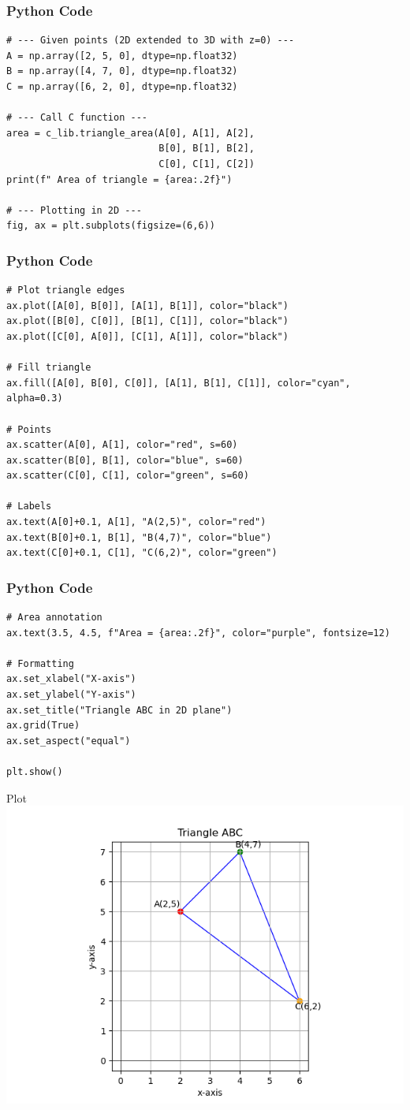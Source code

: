 \documentclass{beamer}
\begin{document}
\begin{frame}[fragile]
    \frametitle{Python Code}
    \begin{lstlisting}
# --- Given points (2D extended to 3D with z=0) ---
A = np.array([2, 5, 0], dtype=np.float32)
B = np.array([4, 7, 0], dtype=np.float32)
C = np.array([6, 2, 0], dtype=np.float32)

# --- Call C function ---
area = c_lib.triangle_area(A[0], A[1], A[2],
                           B[0], B[1], B[2],
                           C[0], C[1], C[2])
print(f" Area of triangle = {area:.2f}")

# --- Plotting in 2D ---
fig, ax = plt.subplots(figsize=(6,6))
    \end{lstlisting}
\end{frame}

\begin{frame}[fragile]
    \frametitle{Python Code}
    \begin{lstlisting}
# Plot triangle edges
ax.plot([A[0], B[0]], [A[1], B[1]], color="black")
ax.plot([B[0], C[0]], [B[1], C[1]], color="black")
ax.plot([C[0], A[0]], [C[1], A[1]], color="black")

# Fill triangle
ax.fill([A[0], B[0], C[0]], [A[1], B[1], C[1]], color="cyan", alpha=0.3)

# Points
ax.scatter(A[0], A[1], color="red", s=60)
ax.scatter(B[0], B[1], color="blue", s=60)
ax.scatter(C[0], C[1], color="green", s=60)

# Labels
ax.text(A[0]+0.1, A[1], "A(2,5)", color="red")
ax.text(B[0]+0.1, B[1], "B(4,7)", color="blue")
ax.text(C[0]+0.1, C[1], "C(6,2)", color="green")

    \end{lstlisting}
\end{frame}

\begin{frame}[fragile]
    \frametitle{Python Code}
    \begin{lstlisting}
# Area annotation
ax.text(3.5, 4.5, f"Area = {area:.2f}", color="purple", fontsize=12)

# Formatting
ax.set_xlabel("X-axis")
ax.set_ylabel("Y-axis")
ax.set_title("Triangle ABC in 2D plane")
ax.grid(True)
ax.set_aspect("equal")

plt.show()
        \end{lstlisting}
\end{frame}

\begin{frame}{Plot}
    \centering
    \includegraphics[width=\columnwidth, height=0.8\textheight, keepaspectratio]{Figs/Fig1.png}     
\end{frame}
\end{document}
